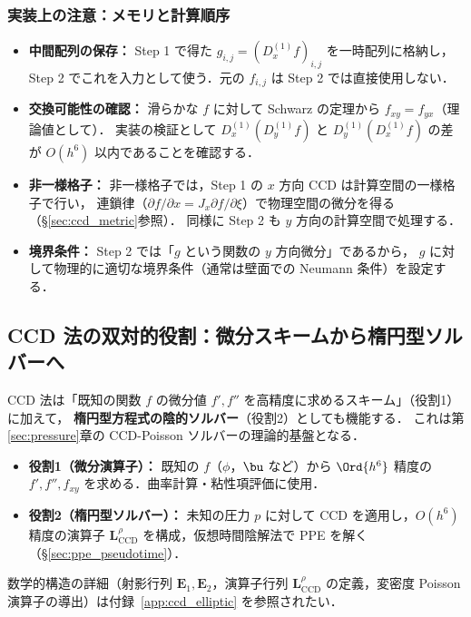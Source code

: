 \medskip

\subsubsection{実装上の注意：メモリと計算順序}

\begin{tcolorbox}[warnbox, title={混合微分実装の落とし穴}]
\begin{itemize}
  \item \textbf{中間配列の保存：} Step 1 で得た $g_{i,j} = (D_x^{(1)} f)_{i,j}$ を一時配列に格納し，
        Step 2 でこれを入力として使う．元の $f_{i,j}$ は Step 2 では直接使用しない．
  \item \textbf{交換可能性の確認：} 滑らかな $f$ に対して Schwarz の定理から $f_{xy} = f_{yx}$（理論値として）．
        実装の検証として $D_x^{(1)}(D_y^{(1)} f)$ と $D_y^{(1)}(D_x^{(1)} f)$ の差が $O(h^6)$ 以内であることを確認する．
  \item \textbf{非一様格子：} 非一様格子では，Step 1 の $x$ 方向 CCD は計算空間の一様格子で行い，
        連鎖律（$\partial f/\partial x = J_x \partial f/\partial\xi$）で物理空間の微分を得る（§\ref{sec:ccd_metric}参照）．
        同様に Step 2 も $y$ 方向の計算空間で処理する．
  \item \textbf{境界条件：} Step 2 では「$g$ という関数の $y$ 方向微分」であるから，
        $g$ に対して物理的に適切な境界条件（通常は壁面での Neumann 条件）を設定する．
\end{itemize}
\end{tcolorbox}

\subsection{CCD 法の双対的役割：微分スキームから楕円型ソルバーへ}
\label{sec:ccd_elliptic}

CCD 法は「既知の関数 $f$ の微分値 $f', f''$ を高精度に求めるスキーム」（役割1）に加えて，
\textbf{楕円型方程式の陰的ソルバー}（役割2）としても機能する．
これは第\ref{sec:pressure}章の CCD-Poisson ソルバーの理論的基盤となる．

\begin{itemize}
  \item \textbf{役割1（微分演算子）：} 既知の $f$（$\phi$，$\bu$ など）から $\Ord{h^6}$ 精度の $f', f'', f_{xy}$ を求める．曲率計算・粘性項評価に使用．
  \item \textbf{役割2（楕円型ソルバー）：} 未知の圧力 $p$ に対して CCD を適用し，$O(h^6)$ 精度の演算子 $\mathbf{L}_{\mathrm{CCD}}^{\rho}$ を構成，仮想時間陰解法で PPE を解く（§\ref{sec:ppe_pseudotime}）．
\end{itemize}

数学的構造の詳細（射影行列 $\mathbf{E}_1, \mathbf{E}_2$，演算子行列 $\mathbf{L}_{\mathrm{CCD}}^{\rho}$ の定義，変密度 Poisson 演算子の導出）は付録~\ref{app:ccd_elliptic} を参照されたい．
